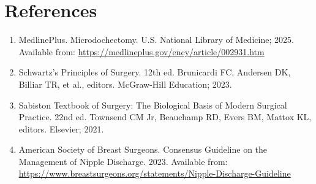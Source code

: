 \section*{References}
\begin{enumerate}
  \item MedlinePlus. Microdochectomy. U.S. National Library of Medicine; 2025. Available from: \url{https://medlineplus.gov/ency/article/002931.htm}
  
  \item Schwartz's Principles of Surgery. 12th ed. Brunicardi FC, Andersen DK, Billiar TR, et al., editors. McGraw-Hill Education; 2023.
  
  \item Sabiston Textbook of Surgery: The Biological Basis of Modern Surgical Practice. 22nd ed. Townsend CM Jr, Beauchamp RD, Evers BM, Mattox KL, editors. Elsevier; 2021.
  
  \item American Society of Breast Surgeons. Consensus Guideline on the Management of Nipple Discharge. 2023. Available from: \url{https://www.breastsurgeons.org/statements/Nipple-Discharge-Guideline}
\end{enumerate}

\clearpage
